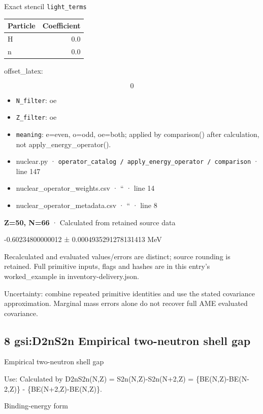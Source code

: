 \documentclass[
  11pt,
  letterpaper,
]{article}
\begin{document}
Exact stencil \texttt{light\_terms}

\begin{longtable}[]{@{}lr@{}}
\toprule\noalign{}
Particle & Coefficient \\
\midrule\noalign{}
\endhead
\bottomrule\noalign{}
\endlastfoot
H & 0.0 \\
n & 0.0 \\
\end{longtable}

offset\_latex:

\[
0
\]

\begin{itemize}
\item
  \texttt{N\_filter}: oe
\item
  \texttt{Z\_filter}: oe
\item
  \texttt{meaning}: e=even, o=odd, oe=both; applied by comparison()
  after calculation, not apply\_energy\_operator().
\item
  nuclear.py ·
  \texttt{operator\_catalog\ /\ apply\_energy\_operator\ /\ comparison}
  · line 147
\item
  nuclear\_operator\_weights.csv · `` · line 14
\item
  nuclear\_operator\_metadata.csv · `` · line 8
\end{itemize}

\textbf{Z=50, N=66} · Calculated from retained source data

-0.60234800000012 ± 0.0004935291278131413 MeV

Recalculated and evaluated values/errors are distinct; source rounding
is retained. Full primitive inputs, flags and hashes are in this entry's
worked\_example in inventory-delivery.json.

Uncertainty: combine repeated primitive identities and use the stated
covariance approximation. Marginal mass errors alone do not recover full
AME evaluated covariance.

\subsection{8 gsi:D2nS2n Empirical two-neutron shell
gap}\label{gsid2ns2n-empirical-two-neutron-shell-gap}

Empirical two-neutron shell gap

Use: Calculated by D2nS2n(N,Z) = S2n(N,Z)-S2n(N+2,Z) =
\{BE(N,Z)-BE(N-2,Z)\} - \{BE(N+2,Z)-BE(N,Z)\}.

Binding-energy form
\end{document}
